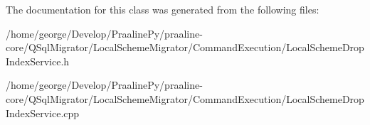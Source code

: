The documentation for this class was generated from the following files\+:\begin{DoxyCompactItemize}
\item 
/home/george/\+Develop/\+Praaline\+Py/praaline-\/core/\+Q\+Sql\+Migrator/\+Local\+Scheme\+Migrator/\+Command\+Execution/Local\+Scheme\+Drop\+Index\+Service.\+h\item 
/home/george/\+Develop/\+Praaline\+Py/praaline-\/core/\+Q\+Sql\+Migrator/\+Local\+Scheme\+Migrator/\+Command\+Execution/Local\+Scheme\+Drop\+Index\+Service.\+cpp\end{DoxyCompactItemize}

